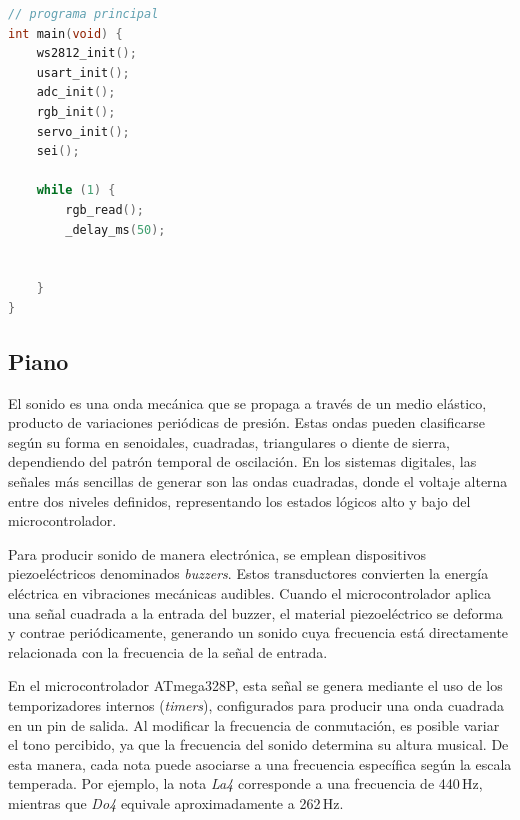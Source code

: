 \begin{lstlisting}[language=C, caption={Bucle principal}]
// programa principal
int main(void) {
	ws2812_init();
	usart_init();
	adc_init();
	rgb_init();
	servo_init();
	sei();
	
	while (1) {
		rgb_read();
		_delay_ms(50);

	
	}
}
\end{lstlisting}













\subsection{Piano}

El sonido es una onda mecánica que se propaga a través de un medio elástico, producto de variaciones periódicas de presión. Estas ondas pueden clasificarse según su forma en senoidales, cuadradas, triangulares o diente de sierra, dependiendo del patrón temporal de oscilación. En los sistemas digitales, las señales más sencillas de generar son las ondas cuadradas, donde el voltaje alterna entre dos niveles definidos, representando los estados lógicos alto y bajo del microcontrolador.

\vspace{1em}

Para producir sonido de manera electrónica, se emplean dispositivos piezoeléctricos denominados \textit{buzzers}. Estos transductores convierten la energía eléctrica en vibraciones mecánicas audibles. Cuando el microcontrolador aplica una señal cuadrada a la entrada del buzzer, el material piezoeléctrico se deforma y contrae periódicamente, generando un sonido cuya frecuencia está directamente relacionada con la frecuencia de la señal de entrada.

\vspace{1em}

En el microcontrolador ATmega328P, esta señal se genera mediante el uso de los temporizadores internos (\textit{timers}), configurados para producir una onda cuadrada en un pin de salida. Al modificar la frecuencia de conmutación, es posible variar el tono percibido, ya que la frecuencia del sonido determina su altura musical. De esta manera, cada nota puede asociarse a una frecuencia específica según la escala temperada. Por ejemplo, la nota \textit{La4} corresponde a una frecuencia de 440\,Hz, mientras que \textit{Do4} equivale aproximadamente a 262\,Hz.

